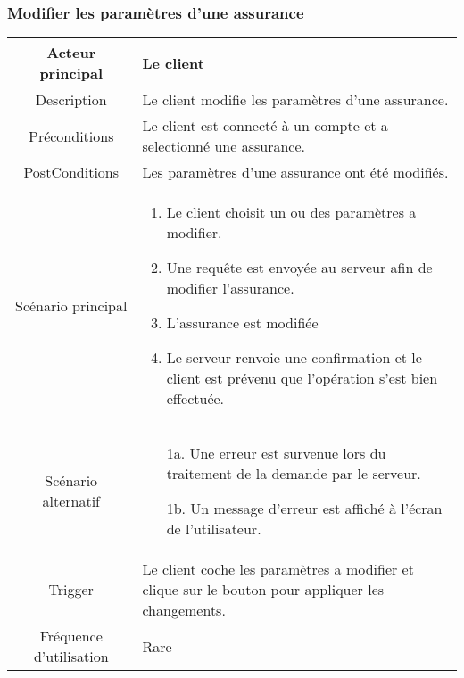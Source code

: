 \documentclass{article}
\begin{document}
\subsubsection{Modifier les paramètres d'une assurance}
\begin{table}[h]
    \begin{tabular}{|c|p{10cm}|}
       \hline
       Acteur principal&Le client\\
       \hline
       Description&Le client modifie les paramètres d'une assurance.\\
       \hline
       Préconditions&Le client est connecté à un compte et a selectionné une assurance.\\
       \hline
       PostConditions&Les paramètres d'une assurance ont été modifiés.\\
       \hline
       Scénario principal& 
             \begin{enumerate}
                \item Le client choisit un ou des paramètres a modifier.
                \item Une requête est envoyée au serveur afin de modifier l'assurance.
                \item L'assurance est modifiée
                \item Le serveur renvoie une confirmation et le client est prévenu que l'opération s'est bien effectuée.
             \end{enumerate}     \\
       \hline
       Scénario alternatif&   
       \begin{itemize}
        \item[1a.] Une erreur est survenue lors du traitement de la demande par le serveur.
        \item[1b.] Un message d'erreur est affiché à l'écran de l'utilisateur. 
    \end{itemize}
       \\
       \hline
       Trigger&Le client coche les paramètres a modifier et clique sur le bouton pour appliquer les changements.\\
       \hline
       Fréquence d'utilisation&Rare\\
       \hline
    \end{tabular}
 \end{table}

\newpage

\end{document}
